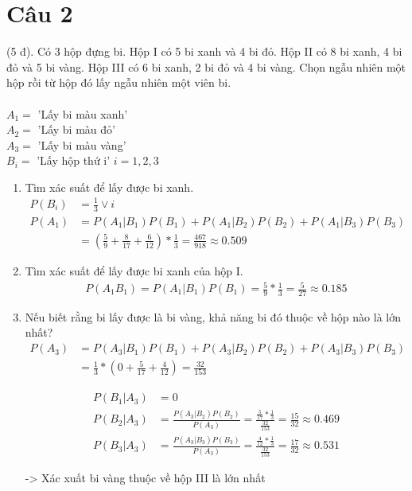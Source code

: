\documentclass[a4paper,12pt]{article}
\begin{document}
	
	\section{Câu 2}
	\label{Cau 2}
	(5 đ). Có 3 hộp đựng bi. Hộp I có 5 bi xanh và 4 bi đỏ. Hộp II có 8 bi xanh, 4 bi đỏ và 5 bi
	vàng. Hộp III có 6 bi xanh, 2 bi đỏ và 4 bi vàng. Chọn ngẫu nhiên một hộp rồi từ hộp đó lấy ngẫu
	nhiên một viên bi. \\
	\vspace{0.5cm}\\
	$A_1 = $ 'Lấy bi màu xanh' \\
	$A_2 = $ 'Lấy bi màu đỏ'\\
	$A_3 = $ 'Lấy bi màu vàng'\\
	$B_i = $ 'Lấy hộp thứ i' $i = 1, 2, 3$ \\
	
	\begin{enumerate}[label=\alph*)]
		\item Tìm xác suất để lấy được bi xanh. \\
		\begin{align*}
		P(B_i) &= \frac{1}{3} \vee i \\
		P(A_1) &= P(A_1|B_1)P(B_1) + P(A_1|B_2) P(B_2) + P(A_1|B_3)P(B_3) \\
		&= (\frac{5}{9} + \frac{8}{17} + \frac{6}{12}) * \frac{1}{3} = \frac{467}{918} \approx 0.509	
		\end{align*}
		
		\item Tìm xác suất để lấy được bi xanh của hộp I. \\
		\begin{align*}
		P(A_1 B_1) = P(A_1|B_1)P(B_1) = \frac{5}{9} * \frac{1}{3} = \frac{5}{27} \approx 0.185
		\end{align*}
		
		\item Nếu biết rằng bi lấy được là bi vàng, khả năng bi đó thuộc về hộp nào là lớn nhất? \\
		\begin{align*}
		P(A_3) &= P(A_3|B_1)P(B_1) + P(A_3|B_2)P(B_2) + P(A_3|B_3)P(B_3) \\
		&= \frac{1}{3} * \left (0 + \frac{5}{17} + \frac{4}{12} \right) = \frac{32}{153}
		\end{align*}
		
		\begin{align*}	
		P(B_1|A_3) &= 0 \\
		P(B_2|A_3) &= \frac{P(A_3|B_2)P(B_2)}{P(A_3)} = \displaystyle{\frac{\frac{5}{17} * \frac{1}{3}}{\frac{32}{153}}} = \frac{15}{32} \approx 0.469 \\
		P(B_3|A_3) &= \frac{P(A_3|B_3)P(B_3)}{P(A_3)} = \displaystyle{\frac{\frac{4}{12} * \frac{1}{3}}{\frac{32}{153}}} = \frac{17}{32} \approx 0.531
		\end{align*}
		
		-> Xác xuất bi vàng thuộc về hộp III là lớn nhất
		\end{enumerate}
	
\end{document}
